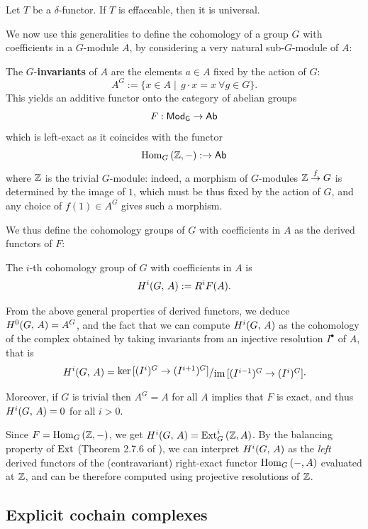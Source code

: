 \documentclass[a4paper, oneside]{memoir}
\begin{document}
\begin{proposition}\label{prop:Effaceable}
	Let $T$ be a $\delta$-functor. If $T$ is effaceable, then it is universal.
\end{proposition}

We now use this generalities to define the cohomology of a group $G$ with coefficients in a $G$-module $A$, by considering a very natural sub-$G$-module of $A$:

\begin{definition}
	The $G$-\textbf{invariants} of $A$ are the elements $a \in A$ fixed by the action of $G$:
	\[
		A^G:=\{x\in A\mid\, g\cdot x=x ~ \forall g\in G\}.
	\]
	This yields an additive functor onto the category of abelian groups
	\[
		F:\mathsf{Mod}_\mathsf{G}\to\mathsf{Ab}
	\]
	which is left-exact as it coincides with the functor
	\[
		\operatorname{Hom}_G{(\mathbb{Z},-)}:\to\mathsf{Ab}
	\]
	where $\mathbb{Z}$ is the trivial $G$-module: indeed, a morphism of $G$-modules $\mathbb{Z}\overset{f}\to G$ is determined by the image of $1$, which must be thus fixed by the action of $G$, and any choice of $f(1)\in A^G$ gives such a morphism.
\end{definition}

We thus define the cohomology groups of $G$ with coefficients in $A$ as the derived functors of $F$:

\begin{definition}
	The $i$-th cohomology group of $G$ with coefficients in $A$ is
	\[
		H^{i}( G, \, A ):=R^iF(A).
	\]
\end{definition}
From the above general properties of derived functors, we deduce $H^{0}( G, \, A )=A^G$, and the fact that we can compute $H^{i}( G, \, A )$ as the cohomology of the complex obtained by taking  invariants from an injective resolution $I^\bullet$ of $A$, that is
\[
	\H{i}{G}{A}=\ssfrac{\ker{[(I^i)^G\to (I^{i+1})^G]}}{\Im{[(I^{i-1})^G\to (I^i)^G]}}.
\]

\noindent Moreover, if $G$ is trivial then $A^G=A$ for all $A$ implies that $F$ is exact, and thus $H^{i}( G, \, A )=0$ for all $i>0$.

\begin{remark}
	Since $F=\operatorname{Hom}_G{(\mathbb{Z},-)}$, we get $H^{i}( G, \, A )=\operatorname{Ext}^i_G{(\mathbb{Z},A)}$. By the balancing property of $\operatorname{Ext}$ (Theorem 2.7.6 of \cite{Weibel}), we can interpret $H^{i}( G, \, A )$ as the \textit{left} derived functors of the (contravariant) right-exact functor $\operatorname{Hom}_G{(-,A)}$ evaluated at $\mathbb{Z}$, and can be therefore computed using projective resolutions of $\mathbb{Z}$.
\end{remark}

\subsection{Explicit cochain complexes}
\end{document}
